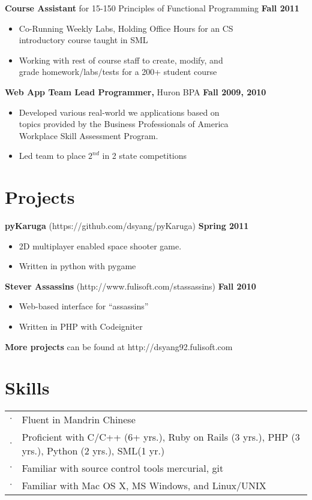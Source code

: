 \documentclass[sectioned]{dsyangres}
\begin{document}
\begin{resume}
\textbf{Course Assistant} for 15-150 Principles of Functional
 Programming \hfill \textbf{Fall 2011}
 \begin{itemize} \itemsep -2pt
   \item Co-Running Weekly Labs, Holding Office Hours for an CS\\
     introductory course taught in SML
   \item Working with rest of course staff to create, modify, and\\ 
     grade homework/labs/tests for a 200+ student course
 \end{itemize}


\textbf{Web App Team Lead Programmer, }
  Huron BPA \hfill \textbf{Fall 2009, 2010}
  \begin{itemize} \itemsep -2pt %
    \item Developed various real-world we applications based on\\
      topics provided by the Business Professionals of America \\
      Workplace Skill Assessment Program.
    \item Led team to place $2^{nd}$ in 2 state competitions
  \end{itemize}



\section{Projects}

\textbf{pyKaruga} (https://github.com/dsyang/pyKaruga) \hfill \textbf{Spring 2011}
  \begin{itemize} \itemsep -2pt
    \item 2D multiplayer enabled space shooter game.
    \item Written in python with pygame
  \end{itemize}

\textbf{Stever Assassins} (http://www.fulisoft.com/stassassins)
 \hfill \textbf{Fall 2010}
  \begin{itemize} \itemsep -2pt
    \item Web-based interface for ``assassins''
    \item Written in PHP with Codeigniter
  \end{itemize}

\textbf{More projects} can be found at http://dsyang92.fulisoft.com

\section{Skills}
  \begin{tabular}{c p{3.5in}}
    $\cdot$ & Fluent in Mandrin Chinese \\
    $\cdot$ & Proficient with C/C++ (6+ yrs.), Ruby on Rails (3 yrs.), PHP (3
       yrs.), Python (2 yrs.), SML(1 yr.)\\
    $\cdot$ & Familiar with source control tools mercurial, git\\
    $\cdot$ & Familiar with Mac OS X, MS Windows, and Linux/UNIX
  \end{tabular}



\end{resume}
\end{document}
